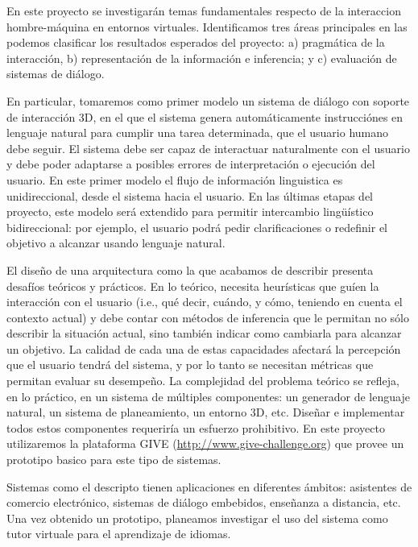 En este proyecto se investigar\'an temas fundamentales respecto de la
interaccion hombre-m\'aquina en entornos virtuales. Identificamos tres
\'areas principales en las podemos clasificar los resultados esperados
del proyecto: a) pragm\'atica de la interacci\'on, b) representaci\'on
de la informaci\'on e inferencia; y c) evaluaci\'on de sistemas
de di\'alogo.

En particular, tomaremos como primer modelo un sistema de di\'alogo con
soporte de interacci\'on 3D, en el que el sistema genera autom\'aticamente
instrucci\'ones en lenguaje natural para cumplir una tarea determinada, que
el usuario humano debe seguir.   El sistema debe ser capaz de interactuar naturalmente
con el usuario y debe poder adaptarse a posibles errores de interpretaci\'on o
ejecuci\'on del usuario.  En este primer modelo el flujo de informaci\'on
linguistica es unidireccional, desde el sistema hacia el usuario.
En las \'ultimas etapas del proyecto, este modelo ser\'a extendido para
permitir intercambio ling\"u\'istico bidireccional: por ejemplo, el usuario podr\'a
pedir clarificaciones o redefinir el objetivo a alcanzar usando lenguaje natural.

El dise\~no de una arquitectura como la que acabamos de describir presenta
desaf\'ios te\'oricos y pr\'acticos.  En lo te\'orico, necesita
heur\'isticas que gu\'ien la interacci\'on con el usuario (i.e., qu\'e decir,
cu\'ando, y c\'omo, teniendo en cuenta el contexto actual) y debe contar con m\'etodos
de inferencia que le permitan no s\'olo describir la situaci\'on actual, sino
tambi\'en indicar como cambiarla para alcanzar un objetivo.
La calidad de cada una de estas capacidades afectar\'a la percepci\'on que
el usuario tendr\'a del sistema, y por lo tanto se necesitan m\'etricas que
permitan evaluar su desempe\~no.  La complejidad del problema te\'orico se
refleja, en lo pr\'actico, en un sistema de m\'ultiples componentes: un
generador de lenguaje natural, un sistema de planeamiento, un entorno 3D, etc.
Dise\~nar e implementar todos estos componentes requerir\'ia un esfuerzo prohibitivo.
En este proyecto utilizaremos la plataforma GIVE (\url{http://www.give-challenge.org}) que
provee un prototipo basico para este tipo de sistemas.

Sistemas como el descripto tienen aplicaciones en diferentes \'ambitos:
asistentes de comercio electr\'onico, sistemas de di\'alogo embebidos,
ense\~nanza a distancia, etc.  Una vez obtenido
un prototipo, planeamos investigar el uso del sistema como
tutor virtuale para el aprendizaje de idiomas.
